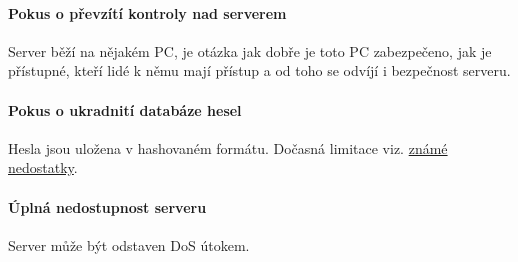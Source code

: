 \documentclass[a4paper]{article}
\begin{document}
\paragraph{Pokus o převzítí kontroly nad serverem} Server běží na nějakém PC, je otázka jak dobře je toto PC zabezpečeno, jak je přístupné, kteří lidé k němu mají přístup a od toho se odvíjí i bezpečnost serveru.
\paragraph{Pokus o ukradnití databáze hesel} Hesla jsou uložena v hashovaném formátu. Dočasná limitace viz. \hyperref[sec:unfinished]{známé nedostatky}.
\paragraph{Úplná nedostupnost serveru} Server může být odstaven DoS útokem.
\end{document}

